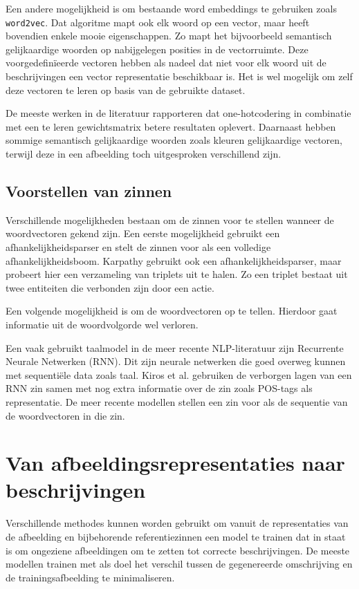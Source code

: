  Een andere mogelijkheid is om bestaande word embeddings te gebruiken zoals \texttt{word2vec}. Dat algoritme mapt ook elk woord op een vector, maar heeft bovendien enkele mooie eigenschappen. Zo mapt het bijvoorbeeld semantisch gelijkaardige woorden op nabijgelegen posities in de vectorruimte.\cite{Mikolov2013} Deze voorgedefin\"ieerde vectoren hebben als nadeel dat niet voor elk woord uit de beschrijvingen een vector representatie beschikbaar is. Het is wel mogelijk om zelf deze vectoren te leren op basis van de gebruikte dataset.

 De meeste werken in de literatuur rapporteren dat one-hotcodering in combinatie met een te leren gewichtsmatrix betere resultaten oplevert. Daarnaast hebben sommige semantisch gelijkaardige woorden zoals kleuren gelijkaardige vectoren, terwijl deze in een afbeelding toch uitgesproken verschillend zijn.\cite{Karpathy2015}
 
 \subsection{Voorstellen van zinnen}
 Verschillende mogelijkheden bestaan om de zinnen voor te stellen wanneer de woordvectoren gekend zijn. Een eerste mogelijkheid gebruikt een afhankelijkheidsparser en stelt de zinnen voor als een volledige afhankelijkheidsboom.\cite{Socher2014} Karpathy\cite{Karpathy2014} gebruikt ook een afhankelijkheidsparser, maar probeert hier een verzameling van triplets uit te halen. Zo een triplet bestaat uit twee entiteiten die verbonden zijn door een actie. 

 Een volgende mogelijkheid is om de woordvectoren op te tellen.\cite{Lebret2013} Hierdoor gaat informatie uit de woordvolgorde wel verloren. 

 Een vaak gebruikt taalmodel in de meer recente NLP-literatuur zijn Recurrente Neurale Netwerken (RNN).\cite{Mikolov2010} Dit zijn neurale netwerken die goed overweg kunnen met sequenti\"ele data zoals taal. Kiros et al.\cite{Kiros2013} gebruiken  de verborgen lagen van een RNN zin samen met nog extra informatie over de zin zoals POS-tags als representatie. De meer recente modellen stellen een zin voor als de sequentie van de woordvectoren in die zin.
 
\section{Van afbeeldingsrepresentaties naar beschrijvingen}
Verschillende methodes kunnen worden gebruikt om vanuit de representaties van de afbeelding en bijbehorende referentiezinnen een model te trainen dat in staat is om ongeziene afbeeldingen om te zetten tot correcte beschrijvingen. 
De meeste modellen trainen met als doel het verschil tussen de gegenereerde omschrijving en de trainingsafbeelding te minimaliseren.


